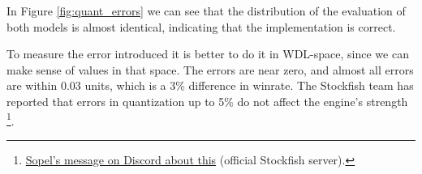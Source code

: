 In Figure \ref{fig:quant_errors} we can see that the distribution of the evaluation of both models is almost identical, indicating that the implementation is correct.

To measure the error introduced it is better to do it in WDL-space, since we can make sense of values in that space. The errors are near zero, and almost all errors are within 0.03 units, which is a 3\% difference in winrate. The Stockfish team has reported that errors in quantization up to 5\% do not affect the engine's strength \footnote{\href{https://discord.com/channels/435943710472011776/718853716266188890/814260897040039977}{Sopel's message on Discord about this} (official Stockfish server).}.
